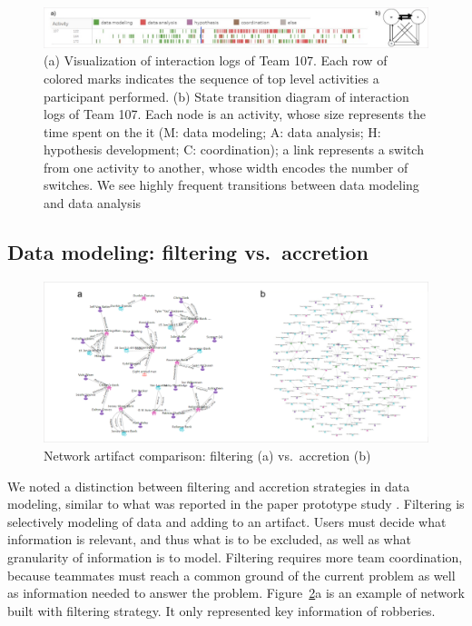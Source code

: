 \begin{figure}
\centering
\includegraphics[width=6.5in]{./img/intertwined.jpg}
\caption{(a) Visualization of interaction logs of Team 107. Each row of
colored marks indicates the sequence of top level activities a
participant performed. (b) State transition diagram of interaction logs of Team 107. Each node is an activity, whose size represents the time spent on the it (M: data modeling; A: data analysis; H: hypothesis development; C: coordination); a
link represents a switch from one activity to another, whose width
encodes the number of switches. We see highly frequent transitions between data modeling and data analysis \label{fig:interleaving}}
\end{figure}


\subsection{Data modeling: filtering vs.~accretion}\label{data-modeling-accretion-vs.filtering}

\begin{figure}
\centering
\includegraphics[width=\columnwidth]{./img/network_accretion_filter.png}
\caption{Network artifact comparison: filtering (a)
vs.~accretion (b) \label{fig:network_accretion}}
\end{figure}

We noted a distinction between filtering and accretion
strategies in data modeling, similar to what was reported in the paper prototype study \cite{Carroll2013}. Filtering is selectively modeling of data
and adding to an artifact. Users must decide what information is
relevant, and thus what is to be excluded, as well as what granularity
of information is to model. Filtering requires more team coordination,
because teammates must reach a common ground of the current problem as
well as information needed to answer the problem. Figure~\ref{fig:network_accretion}a is an example of network built with filtering strategy. It only represented key information of robberies.

